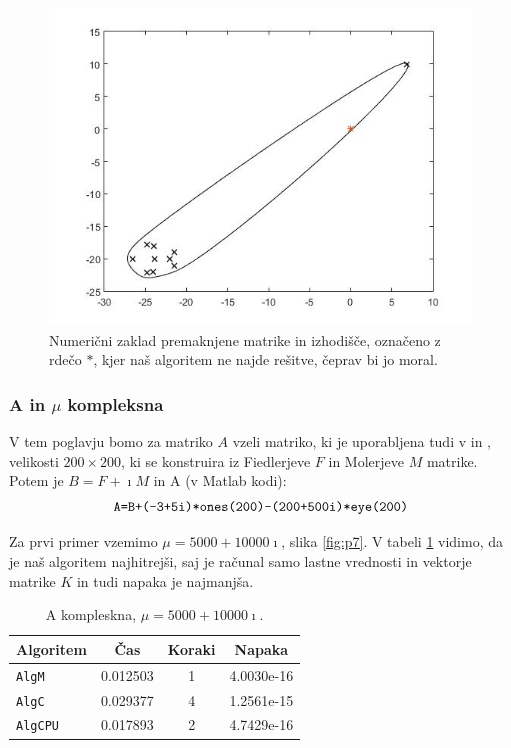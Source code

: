 \documentclass[12pt,a4paper]{amsart}
\theoremstyle{definition}
\theoremstyle{plain}
\begin{document}
\begin{figure}[H]
\includegraphics[scale=0.4]{RCnires-NOV.jpg}
\caption{Numerični zaklad premaknjene matrike in izhodišče, označeno z rdečo $\ast$, kjer naš algoritem ne najde rešitve, čeprav bi jo moral.}
\label{fig:p64}
\end{figure}
\subsubsection{A in $\mu$ kompleksna}
V tem poglavju bomo za matriko $A$ vzeli matriko,  ki je uporabljena tudi v \cite{meurant} in \cite{trije}, velikosti $200\times 200$, ki se konstruira iz Fiedlerjeve $F$ in Molerjeve $M$ matrike. Potem je $B=F + \imath M$ in A (v Matlab kodi):
$$\verb~A=B+(-3+5i)*ones(200)-(200+500i)*eye(200)~$$

Za prvi primer vzemimo $\mu = 5000+10000\imath$, slika \ref{fig:p7}. V tabeli \ref{t7} vidimo, da je naš algoritem najhitrejši, saj je računal samo lastne vrednosti in vektorje matrike $K$ in tudi napaka je najmanjša.


\begin{table}[H]
\caption{A kompleskna, $\mu = 5000+10000\imath$.}
\begin{tabular}{|l|c|c|c|}
\hline
Algoritem & Čas & Koraki & Napaka\\
\hline
\hline
\verb+AlgM+ &0.012503&1&4.0030e-16\\
\hline
\verb+AlgC+ &0.029377&4& 1.2561e-15\\
\hline
\verb+AlgCPU+ &0.017893&2&4.7429e-16\\
\hline
\end{tabular}

\label{t7}
\end{table}
\end{document}
